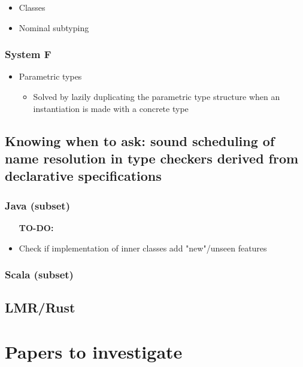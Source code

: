        \begin{itemize}
          \item Classes
          \item Nominal subtyping
        \end{itemize}

      \subsubsection{System F}

        \begin{itemize}
          \item Parametric types
          \begin{itemize}
            \item Solved by lazily duplicating the parametric type structure when an instantiation is made with a concrete type
          \end{itemize}
        \end{itemize}

    \subsection{Knowing when to ask: sound scheduling of name resolution in type checkers derived from declarative specifications}

      \subsubsection{Java (subset)}

        \begin{itemize}
          \item [\textbf{TO-DO:}]
          \item Check if implementation of inner classes add "new"/unseen features 
        \end{itemize}

      \subsubsection{Scala (subset)}

      \subsection{LMR/Rust}

  \section{Papers to investigate}

